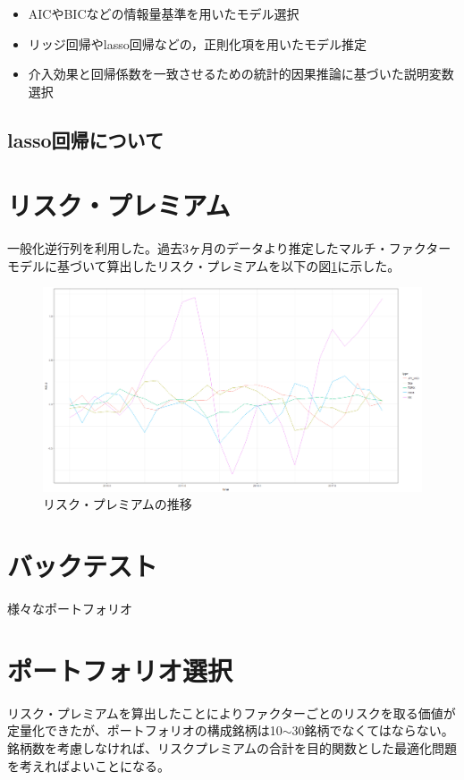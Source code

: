 \documentclass[11pt]{jreport}
\begin{document}
\begin{itemize}
\item AICやBICなどの情報量基準を用いたモデル選択
\item リッジ回帰やlasso回帰などの，正則化項を用いたモデル推定
\item 介入効果と回帰係数を一致させるための統計的因果推論に基づいた説明変数選択
\end{itemize}

\subsection{lasso回帰について}
\section{リスク・プレミアム}
一般化逆行列を利用した。過去3ヶ月のデータより推定したマルチ・ファクターモデルに基づいて算出したリスク・プレミアムを以下の図\ref{fig:riskpremium}に示した。

\begin{figure}[H]
	\begin{center}
		\includegraphics[width=15cm]{./fig/riskpremium.png}
		\caption{リスク・プレミアムの推移}
		\label{fig:riskpremium}
	\end{center}
\end{figure}
\section{バックテスト}
様々なポートフォリオ

\section{ポートフォリオ選択}
リスク・プレミアムを算出したことによりファクターごとのリスクを取る価値が定量化できたが、ポートフォリオの構成銘柄は10$\sim$30銘柄でなくてはならない。銘柄数を考慮しなければ、リスクプレミアムの合計を目的関数とした最適化問題を考えればよいことになる。
\end{document}
